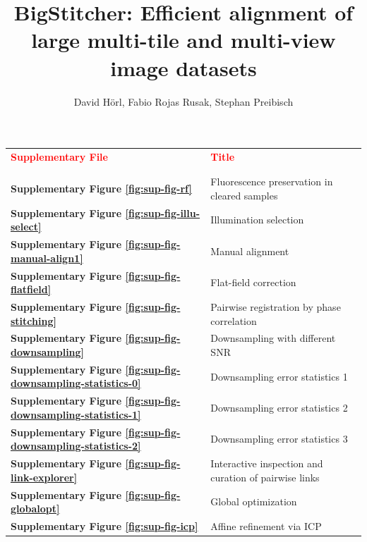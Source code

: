 \documentclass[]{spie}  %
\title{BigStitcher: Efficient alignment of large multi-tile and multi-view image datasets}
\author{David H{\"o}rl, Fabio Rojas Rusak, Stephan Preibisch
}
\newcommand\tablespace{\vspace{2.5mm}}
\begin{document}
\maketitle

\setcounter{page}{1}


\hspace{20mm}

\begin{table}[h!]
\center
{
\fontsize{12pt}{11pt}\selectfont
\center
\begin{tabular}{lp{11cm}}
\textbf{\textcolor{red}{Supplementary File}} & \textbf{\textcolor{red}{Title}}\\ \\
\hline
\\
\textbf{Supplementary Figure \ref{fig:sup-fig-rf}} & Fluorescence preservation in cleared samples\tablespace \\
\textbf{Supplementary Figure \ref{fig:sup-fig-illu-select}} & Illumination selection \tablespace \\
\textbf{Supplementary Figure \ref{fig:sup-fig-manual-align1}} &  Manual alignment \tablespace \\
\textbf{Supplementary Figure \ref{fig:sup-fig-flatfield}} & Flat-field correction \tablespace \\
\textbf{Supplementary Figure \ref{fig:sup-fig-stitching}} & Pairwise registration by phase correlation \tablespace \\
\textbf{Supplementary Figure \ref{fig:sup-fig-downsampling}} & Downsampling with different SNR \tablespace \\
\textbf{Supplementary Figure \ref{fig:sup-fig-downsampling-statistics-0}} & Downsampling error statistics 1 \tablespace \\
\textbf{Supplementary Figure \ref{fig:sup-fig-downsampling-statistics-1}} & Downsampling error statistics 2 \tablespace \\
\textbf{Supplementary Figure \ref{fig:sup-fig-downsampling-statistics-2}} & Downsampling error statistics 3 \tablespace \\
\textbf{Supplementary Figure \ref{fig:sup-fig-link-explorer}} & Interactive inspection and curation of pairwise links \tablespace \\
\textbf{Supplementary Figure \ref{fig:sup-fig-globalopt}} & Global optimization \tablespace \\
\textbf{Supplementary Figure \ref{fig:sup-fig-icp}} & Affine refinement via ICP \tablespace \\

\end{tabular}}
\end{table}
\end{document}
